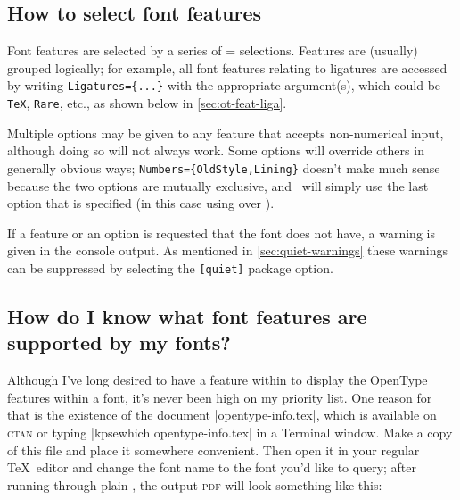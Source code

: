 \subsection{How to select font features}

Font features are selected by a series of =
selections. Features are (usually) grouped logically; for example, all
font features relating to ligatures are accessed by writing \verb|Ligatures={...}| with the appropriate argument(s), which could be \texttt{TeX}, \texttt{Rare}, etc., as shown below in \ref{sec:ot-feat-liga}.

Multiple options may be given to
any feature that accepts non-numerical input, although doing so will
not always work. Some options will override others in generally
obvious ways; \Verb|Numbers={OldStyle,Lining}| doesn't make much
sense because the two options are mutually exclusive, and \XeTeX\
will simply use the last option that is specified (in this case
using  over ).

If a feature or an option is requested that the font does not have,
a warning is given in the console output. As mentioned in \vref{sec:quiet-warnings}
these warnings can be suppressed by selecting the \texttt{[quiet]} package option.

\subsection{How do I know what font features are supported by my fonts?}

Although I've long desired to have a feature within  to display the OpenType features within a font, it's never been high on my priority list.
One reason for that is the existence of the document |opentype-info.tex|, which is available on \textsc{ctan} or typing |kpsewhich opentype-info.tex| in a Terminal window.
Make a copy of this file and place it somewhere convenient.
Then open it in your regular \TeX\ editor and change the font name to the font you'd like to query; after running through plain \XeTeX, the output \textsc{pdf} will look something like this:

